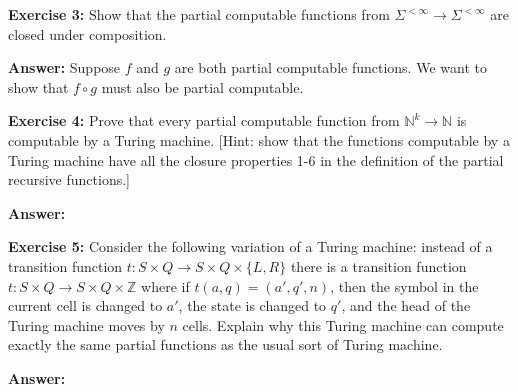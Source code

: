 \vspace{5mm}
\noindent \textbf{Exercise 3:}
Show that the partial computable functions from $\Sigma^{< \infty} \to \Sigma^{< \infty}$ are closed under composition.

\vspace{2mm}
\noindent \textbf{Answer:} 
Suppose $f$ and $g$ are both partial computable functions.
We want to show that $f \circ g$ must also be partial computable.



\vspace{5mm}
\noindent \textbf{Exercise 4:} Prove that every partial computable function from $\mathbb N ^k \to \mathbb N$ is computable by a Turing machine.
[Hint: show that the functions computable by a Turing machine have all the closure properties 1-6 in the definition of the partial recursive functions.]

\vspace{2mm}
\noindent \textbf{Answer:} 

\vspace{5mm}
\noindent \textbf{Exercise 5:} Consider the following variation of a Turing machine: 
instead of a transition function $t: S \times Q \to S \times Q \times \{L, R\}$ there is a transition function $t: S \times Q \to S \times Q \times \mathbb Z$ where if $t(a, q) = (a', q', n)$, then the symbol in the current cell is changed to $a'$, the state is changed to $q'$, and the head of the Turing machine moves by $n$ cells.
Explain why this Turing machine can compute exactly the same partial functions as the usual sort of Turing machine.

\vspace{2mm}
\noindent \textbf{Answer:} 
